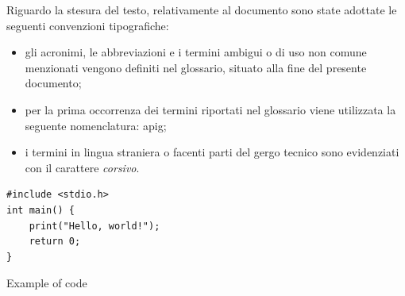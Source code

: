 Riguardo la stesura del testo, relativamente al documento sono state adottate le seguenti convenzioni tipografiche:
\begin{itemize}
	\item gli acronimi, le abbreviazioni e i termini ambigui o di uso non comune menzionati vengono definiti nel glossario, situato alla fine del presente documento;
	\item per la prima occorrenza dei termini riportati nel glossario viene utilizzata la seguente nomenclatura: \gls{apig};
	\item i termini in lingua straniera o facenti parti del gergo tecnico sono evidenziati con il carattere \textit{corsivo}.
\end{itemize}

\begin{listing}[H]
\begin{verbatim}
#include <stdio.h>
int main() {
    print("Hello, world!");
    return 0;
}
\end{verbatim}
\caption{Example of code}
\label{listing:a}
\end{listing}

\newpage